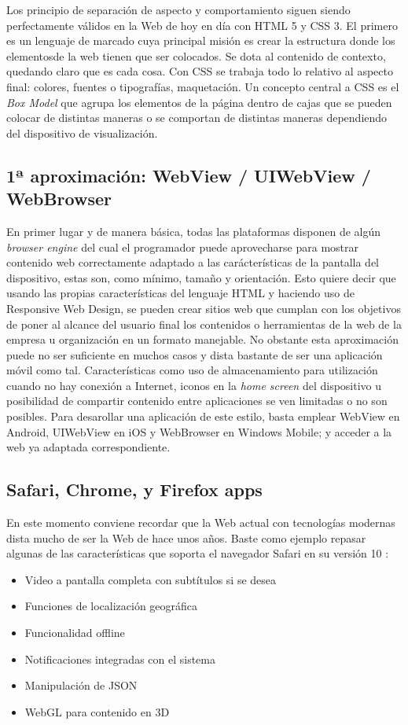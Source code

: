 \documentclass[
10pt, %
a4paper, %
oneside, %
headinclude,footinclude, %
BCOR5mm, %
]{scrartcl}
\begin{document}
Los principio de separación de aspecto y comportamiento siguen siendo perfectamente válidos en la Web de hoy en día con HTML 5 y CSS 3. El primero es un lenguaje de marcado cuya principal misión es crear la estructura donde los elementosde la web tienen que ser colocados. Se dota al contenido de contexto, quedando claro que es cada cosa. Con CSS se trabaja todo lo relativo al aspecto final: colores, fuentes o tipografías, maquetación. Un concepto central a CSS es el \textit{Box Model} que agrupa los elementos de la página dentro de cajas que se pueden colocar de distintas maneras o se comportan de distintas maneras dependiendo del dispositivo de visualización.

\subsection{1ª aproximación: WebView / UIWebView / WebBrowser}
En primer lugar y de manera básica, todas las plataformas disponen de algún \textit{browser engine} del cual el programador puede aprovecharse para mostrar contenido web correctamente adaptado a las carácterísticas de la pantalla del dispositivo, estas son, como mínimo, tamaño y orientación. Esto quiere decir que usando las propias características del lenguaje HTML y haciendo uso de Responsive Web Design, se pueden crear sitios web que cumplan con los objetivos de poner al alcance del usuario final los contenidos o herramientas de la web de la empresa u organización en un formato manejable. No obstante esta aproximación puede no ser suficiente en muchos casos y dista bastante de ser una aplicación móvil como tal. Características como uso de almacenamiento para utilización cuando no hay conexión a Internet, iconos en la \textit{home screen} del dispositivo u posibilidad de compartir contenido entre aplicaciones se ven limitadas o no son posibles. Para desarollar una aplicación de este estilo, basta emplear WebView en Android, UIWebView en iOS y WebBrowser en Windows Mobile; y acceder a la web ya adaptada correspondiente.

\subsection{Safari, Chrome, y Firefox apps}
En este momento conviene recordar que la Web actual con tecnologías modernas dista mucho de ser la Web de hace unos años. Baste como ejemplo repasar algunas de las características que soporta el navegador Safari en su versión 10 \cite{apple_inc._features_2016}:
\begin{itemize}[noitemsep]
\item Video a pantalla completa con subtítulos si se desea
\item Funciones de localización geográfica
\item Funcionalidad offline
\item Notificaciones integradas con el sistema
\item Manipulación de JSON
\item WebGL para contenido en 3D
\end{itemize}
\end{document}
